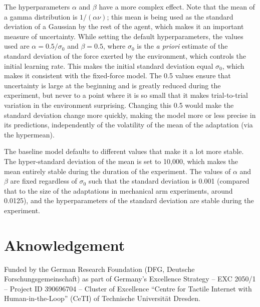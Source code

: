 \documentclass[a4paper,doc,floatsintext,natbib]{apa6}
\begin{document}
The hyperparameters $\alpha$ and $\beta$ have a more complex effect. Note that
the mean of a gamma distribution is $1 / (\alpha \nu)$; this mean is being used
as the standard deviation of a Gaussian by the rest of the agent, which makes it
an important measure of uncertainty. While setting the default hyperparameters,
the values used are $\alpha = 0.5 / \sigma_0$ and $\beta = 0.5$, where
$\sigma_0$ is the \textit{a priori} estimate of the standard deviation of the
force exerted by the environment, which controls the initial learning rate. This
makes the initial standard deviation equal $\sigma_0$, which makes it consistent
with the fixed-force model. The 0.5 values ensure that uncertainty is large at
the beginning and is greatly reduced during the experiment, but never to a point
where it is so small that it makes trial-to-trial variation in the environment
surprising. Changing this 0.5 would make the standard deviation change more
quickly, making the model more or less precise in its predictions, independently
of the volatility of the mean of the adaptation (via the hypermean).

The baseline model defaults to different values that make it a lot more
stable. The hyper-standard deviation of the mean is set to 10,000, which makes
the mean entirely stable during the duration of the experiment. The values of
$\alpha$ and $\beta$ are fixed regardless of $\sigma_0$ such that the standard
deviation is 0.001 (compared that to the size of the adaptations in mechanical
arm experiments, around 0.0125), and the hyperparameters of the standard
deviation are stable during the experiment.


\section{Aknowledgement}
Funded by the German Research Foundation (DFG, Deutsche Forschungsgemeinschaft) as part of Germany’s Excellence Strategy – EXC 2050/1 – Project ID 390696704 – Cluster of Excellence “Centre for Tactile Internet with Human-in-the-Loop” (CeTI) of Technische Universität Dresden.


\end{document}

